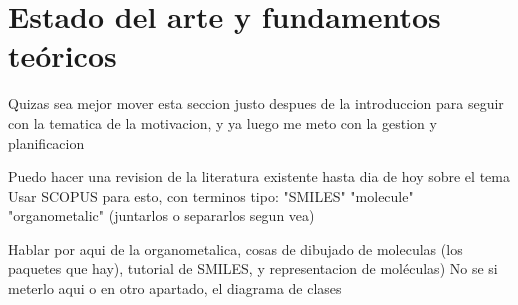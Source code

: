 \chapter{Estado del arte y fundamentos teóricos}

Quizas sea mejor mover esta seccion justo despues de la introduccion para seguir con la tematica de la motivacion, y ya luego me meto con la gestion y planificacion

Puedo hacer una revision de la literatura existente hasta dia de hoy sobre el tema
Usar SCOPUS para esto, con terminos tipo: "SMILES" "molecule" "organometalic" (juntarlos o separarlos segun vea)

Hablar por aqui de la organometalica, cosas de dibujado de moleculas (los paquetes que hay), tutorial de SMILES, y representacion de moléculas)
No se si meterlo aqui o en otro apartado, el diagrama de clases